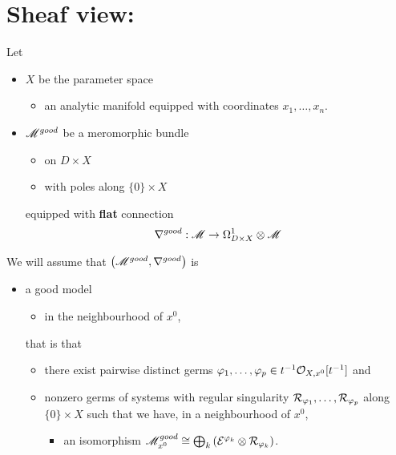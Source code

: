 \section{Sheaf view: \cite{sabbah2007isomonodromic}} %
Let
\begin{itemize}
  \item $X$ be the \textcolor{green!40!black}{parameter space}
    \begin{itemize}
      \item an analytic manifold equipped with coordinates $x_1,\ldots,x_n$.
    \end{itemize}
  \item $\mathscr{M}^{good}$ be a meromorphic bundle
    \begin{itemize}
      \item on $D\times X$
      \item with poles along $\{0\}\times X$
    \end{itemize}
    equipped with \textbf{flat} connection
    \[
      \nabla^{good}:\mathscr{M}\to\Omega_{D\times X}^1\otimes\mathscr{M}
    \]
\end{itemize}
We will assume that $\left(\mathscr{M}^{good},\nabla^{good}\right)$ is
\begin{itemize}
  \item a good model
    \begin{itemize}
      \item in the neighbourhood of $x^0$,
    \end{itemize}
    that is that
    \begin{itemize}
      \item there exist pairwise distinct germs $\varphi_1,\dots,\varphi_p\in
        t^{-1}\mathcal{O}_{X,x^0}[t^{-1}]$ and
      \item nonzero germs of systems with regular singularity
        $\mathcal{R}_{\varphi_1},\dots,\mathcal{R}_{\varphi_p}$ along $\{0\}\times X$ such that
            we have, in a neighbourhood of $x^0$,
        \begin{itemize}
          \item an isomorphism $\mathscr{M}_{x^0}^{good}
            \cong\bigoplus_k\left(\mathcal{E}^{\varphi_k}\otimes\mathcal{R}_{\varphi_k}\right)$.
        \end{itemize}
    \end{itemize}
\end{itemize}
\begin{comment}
  $k\neq l$ $\overset{\text{II.5.6}}{\Rightarrow{}}$ the order of the pole with
  respect to $t$ of $(\phi_k-\phi_l)(x,t)$ does not depend on $x$ in a
  neighbourhood of $x^0$.
\end{comment}

